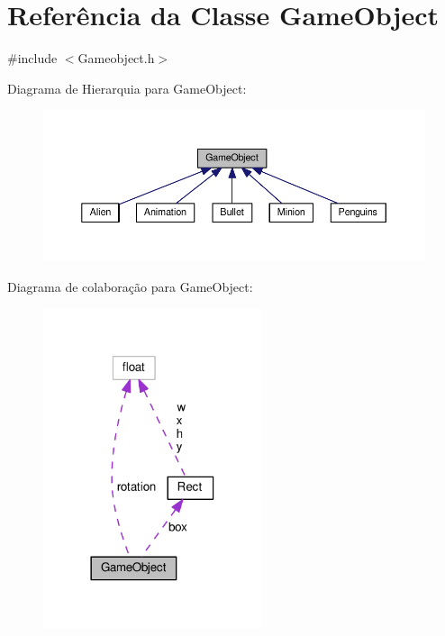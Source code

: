 \hypertarget{classGameObject}{\section{Referência da Classe Game\+Object}
\label{classGameObject}
}


{\ttfamily \#include $<$Gameobject.\+h$>$}



Diagrama de Hierarquia para Game\+Object\+:\nopagebreak
\begin{figure}[H]
\begin{center}
\leavevmode
\includegraphics[width=350pt]{classGameObject__inherit__graph}
\end{center}
\end{figure}


Diagrama de colaboração para Game\+Object\+:\nopagebreak
\begin{figure}[H]
\begin{center}
\leavevmode
\includegraphics[width=182pt]{classGameObject__coll__graph}
\end{center}
\end{figure}
